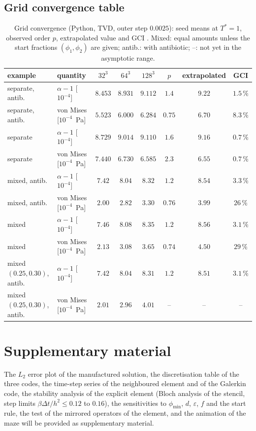 \documentclass[11pt,a4paper]{article}
\begin{document}
\subsection{Grid convergence table}
\label{app:gci}

\begin{table}[htbp]
  \centering
  \caption{Grid convergence (Python, TVD, outer step $0.0025$): seed means at $T^*=1$, observed order $p$, extrapolated value and GCI \citep{Celik2008GCI}. Mixed: equal amounts unless the start fractions $(\phi_1,\phi_2)$ are given; antib.: with antibiotic; --: not yet in the asymptotic range.}
  \label{tab:gci}
  \small
  \setlength{\tabcolsep}{3.5pt}
  \begin{tabular}{llcccccc}
    \toprule
    example & quantity & $32^3$ & $64^3$ & $128^3$ & $p$ & extrapolated & GCI \\
    \midrule
    separate, antib. & $\alpha-1$ [$10^{-4}$] & $8.453$ & $8.931$ & $9.112$ & $1.4$ & $9.22$ & $1.5\,\%$ \\
    separate, antib. & von Mises [$10^{-4}$~Pa] & $5.523$ & $6.000$ & $6.284$ & $0.75$ & $6.70$ & $8.3\,\%$ \\
    separate & $\alpha-1$ [$10^{-4}$] & $8.729$ & $9.014$ & $9.110$ & $1.6$ & $9.16$ & $0.7\,\%$ \\
    separate & von Mises [$10^{-4}$~Pa] & $7.440$ & $6.730$ & $6.585$ & $2.3$ & $6.55$ & $0.7\,\%$ \\
    mixed, antib. & $\alpha-1$ [$10^{-4}$] & $7.42$ & $8.04$ & $8.32$ & $1.2$ & $8.54$ & $3.3\,\%$ \\
    mixed, antib. & von Mises [$10^{-4}$~Pa] & $2.00$ & $2.82$ & $3.30$ & $0.76$ & $3.99$ & $26\,\%$ \\
    mixed & $\alpha-1$ [$10^{-4}$] & $7.46$ & $8.08$ & $8.35$ & $1.2$ & $8.56$ & $3.1\,\%$ \\
    mixed & von Mises [$10^{-4}$~Pa] & $2.13$ & $3.08$ & $3.65$ & $0.74$ & $4.50$ & $29\,\%$ \\
    mixed $(0.25,0.30)$, antib. & $\alpha-1$ [$10^{-4}$] & $7.42$ & $8.04$ & $8.31$ & $1.2$ & $8.51$ & $3.1\,\%$ \\
    mixed $(0.25,0.30)$, antib. & von Mises [$10^{-4}$~Pa] & $2.01$ & $2.96$ & $4.01$ & -- & -- & -- \\
    \bottomrule
  \end{tabular}
\end{table}

\section*{Supplementary material}
The $L_2$ error plot of the manufactured solution, the discretisation table of the three codes, the time-step series of the neighboured element and of the Galerkin code, the stability analysis of the explicit element (Bloch analysis of the stencil, step limits $\beta\Delta t/h^2\le0.12$ to $0.16$), the sensitivities to $\phi_{\min}$, $d$, $\varepsilon$, $f$ and the start rule, the test of the mirrored operators of the element, and the animation of the maze will be provided as supplementary material.

{\small


}
\end{document}
